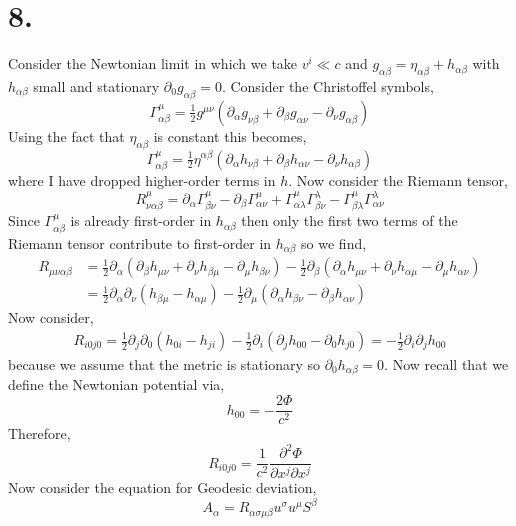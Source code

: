 \documentclass[12pt]{article}
\begin{document}
\section*{8.}

Consider the Newtonian limit in which we take $v^i \ll c$ and $g_{\alpha \beta} = \eta_{\alpha \beta} + h_{\alpha \beta}$ with $h_{\alpha \beta}$ small and stationary $\partial_0 g_{\alpha \beta} = 0$. Consider the Christoffel symbols,
\[ \Gamma^\mu_{\alpha \beta} = \tfrac{1}{2} g^{\mu \nu} \left( \partial_\alpha g_{\nu \beta} + \partial_\beta g_{\alpha \nu} - \partial_\nu g_{\alpha \beta} \right) \]
Using the fact that $\eta_{\alpha \beta}$ is constant this becomes,
\[ \Gamma^\mu_{\alpha \beta} = \tfrac{1}{2} \eta^{\alpha \beta} \left( \partial_\alpha h_{\nu \beta} + \partial_\beta h_{\alpha \nu} - \partial_\nu h_{\alpha \beta} \right) \]
where I have dropped higher-order terms in $h$. Now consider the Riemann tensor,
\[ R^\mu_{\nu \alpha \beta} = \partial_\alpha \Gamma^\mu_{\beta \nu} - \partial_\beta \Gamma^\mu_{\alpha \nu} + \Gamma^\mu_{\alpha \lambda} \Gamma^\lambda_{\beta \nu} - \Gamma^\mu_{\beta \lambda} \Gamma^\lambda_{\alpha \nu} \]
Since $\Gamma^\mu_{\alpha \beta}$ is already first-order in $h_{\alpha\beta}$ then only the first two terms of the Riemann tensor contribute to first-order in $h_{\alpha \beta}$ so we find,
\begin{align*}
R_{\mu \nu \alpha \beta} & = \tfrac{1}{2} \partial_\alpha (\partial_\beta h_{\mu \nu} + \partial_\nu h_{\beta \mu} - \partial_\mu h_{\beta \nu} ) - \tfrac{1}{2} \partial_\beta (\partial_\alpha h_{\mu \nu} + \partial_\nu h_{\alpha \mu} - \partial_\mu h_{\alpha \nu} ) 
\\
& = \tfrac{1}{2} \partial_\alpha \partial_\nu (h_{\beta \mu} - h_{\alpha \mu} ) - \tfrac{1}{2} \partial_\mu (\partial_\alpha h_{\beta \nu} - \partial_\beta h_{\alpha \nu} ) 
\end{align*}
Now consider,
\begin{align*}
R_{i0j0} = \tfrac{1}{2} \partial_j \partial_0 (h_{0i} - h_{ji}) - \tfrac{1}{2} \partial_i (\partial_j h_{00} - \partial_0 h_{j0}) = - \tfrac{1}{2} \partial_i \partial_j h_{00} 
\end{align*}
because we assume that the metric is stationary so $\partial_0 h_{\alpha \beta} = 0$. Now recall that we define the Newtonian potential via,
\[ h_{00} = - \frac{2 \Phi}{c^2} \]
Therefore,
\[ R_{i0j0} = \frac{1}{c^2} \frac{\partial^2 \Phi}{\partial x^j \partial x^j} \]
Now consider the equation for Geodesic deviation,
\[ A_\alpha = R_{\alpha \sigma \mu \beta} u^\sigma u^\mu S^\beta \]
\end{document}
